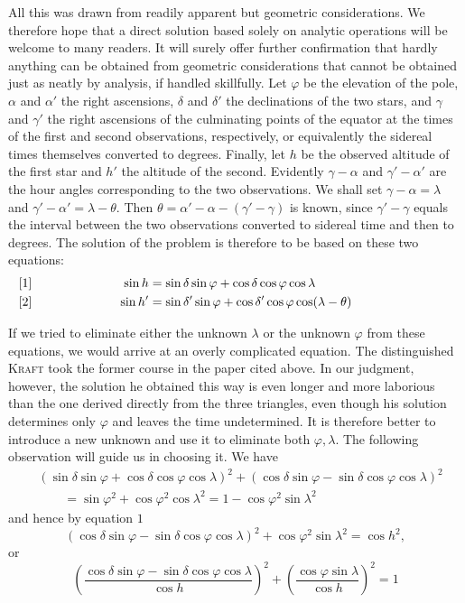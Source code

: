 All this was drawn from readily apparent but geometric considerations. We therefore hope that a direct solution based solely on analytic operations will be welcome to many readers. It will surely offer further confirmation that hardly anything can be obtained from geometric considerations that cannot be obtained just as neatly by analysis, if handled skillfully.
\begingroup
\newcommand{\GaussVIPoliLabel}[3]{%
  \makebox[0pt][l]{[#2]}%
  \makebox[#1\linewidth][r]{$\displaystyle #3$}%
}
\newcommand{\GaussVIPoliAligned}[1]{%
  \[\makebox[\linewidth][l]{$\displaystyle\begin{aligned}#1\end{aligned}$}\]%
}
\newcommand{\GaussVIPoliSingle}[2]{%
  \[\makebox[\linewidth][l]{%
    \makebox[0pt][l]{[#1]}%
    \makebox[\linewidth][c]{$\displaystyle #2$}}\]%
}
Let $\varphi$ be the elevation of the pole, $\alpha$ and $\alpha'$ the right ascensions, $\delta$ and $\delta'$ the declinations of the two stars, and $\gamma$ and $\gamma'$ the right ascensions of the culminating points of the equator at the times of the first and second observations, respectively, or equivalently the sidereal times themselves converted to degrees. Finally, let $h$ be the observed altitude of the first star and $h'$ the altitude of the second. Evidently $\gamma-\alpha$ and $\gamma'-\alpha'$ are the hour angles corresponding to the two observations. We shall set $\gamma-\alpha=\lambda$ and $\gamma'-\alpha'=\lambda-\theta$. Then $\theta=\alpha'-\alpha-(\gamma'-\gamma)$ is known, since $\gamma'-\gamma$ equals the interval between the two observations converted to sidereal time and then to degrees. The solution of the problem is therefore to be based on these two equations:
\GaussVIPoliAligned{
\GaussVIPoliLabel{.30}{1}{\sin h}&=\sin\delta\sin\varphi+\cos\delta\cos\varphi\cos\lambda\\
\GaussVIPoliLabel{.30}{2}{\sin h'}&=\sin\delta'\sin\varphi+\cos\delta'\cos\varphi\cos(\lambda-\theta)
}
If we tried to eliminate either the unknown $\lambda$ or the unknown $\varphi$ from these equations, we would arrive at an overly complicated equation. The distinguished \textsc{Kraft} took the former course in the paper cited above. In our judgment, however, the solution he obtained this way is even longer and more laborious than the one derived directly from the three triangles, even though his solution determines only $\varphi$ and leaves the time undetermined. It is therefore better to introduce a new unknown and use it to eliminate both $\varphi,\lambda$. The following observation will guide us in choosing it. We have
\[
\begin{aligned}
&(\sin\delta\sin\varphi+\cos\delta\cos\varphi\cos\lambda)^2+(\cos\delta\sin\varphi-\sin\delta\cos\varphi\cos\lambda)^2\\
&\qquad=\sin\varphi^2+\cos\varphi^2\cos\lambda^2=1-\cos\varphi^2\sin\lambda^2
\end{aligned}
\]
and hence by equation $1$
\[
(\cos\delta\sin\varphi-\sin\delta\cos\varphi\cos\lambda)^2+\cos\varphi^2\sin\lambda^2=\cos h^2,
\]
or
\[
\left(\frac{\cos\delta\sin\varphi-\sin\delta\cos\varphi\cos\lambda}{\cos h}\right)^2+\left(\frac{\cos\varphi\sin\lambda}{\cos h}\right)^2=1
\]

